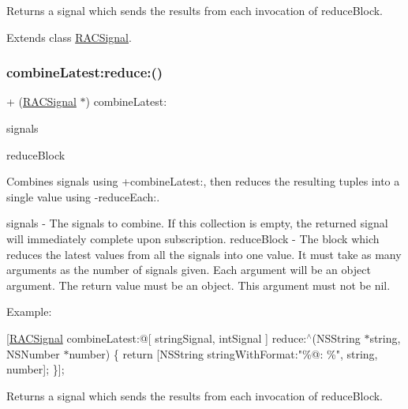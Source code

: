 Returns a signal which sends the results from each invocation of {\ttfamily reduce\+Block}. 

Extends class \mbox{\hyperlink{interface_r_a_c_signal_a5e4d2db914a14c415646d9fdda131221}{R\+A\+C\+Signal}}.

\mbox{\label{category_r_a_c_signal_07_operations_08_a5e4d2db914a14c415646d9fdda131221}} 
\subsubsection{\texorpdfstring{combine\+Latest\+:reduce\+:()}{combineLatest:reduce:()}\hspace{0.1cm}{\footnotesize\ttfamily [3/3]}}
{\footnotesize\ttfamily + (\mbox{\hyperlink{interface_r_a_c_signal}{R\+A\+C\+Signal}} $\ast$) combine\+Latest\+: \begin{DoxyParamCaption}\item[{(id$<$N\+S\+Fast\+Enumeration$>$)}]{signals }\item[{reduce:(id($^\wedge$)())}]{reduce\+Block }\end{DoxyParamCaption}}

Combines signals using +combine\+Latest\+:, then reduces the resulting tuples into a single value using -\/reduce\+Each\+:.

signals -\/ The signals to combine. If this collection is empty, the returned signal will immediately complete upon subscription. reduce\+Block -\/ The block which reduces the latest values from all the signals into one value. It must take as many arguments as the number of signals given. Each argument will be an object argument. The return value must be an object. This argument must not be nil.

Example\+:

\mbox{[}\mbox{\hyperlink{interface_r_a_c_signal}{R\+A\+C\+Signal}} combine\+Latest\+:@\mbox{[} string\+Signal, int\+Signal \mbox{]} reduce\+:$^\wedge$(N\+S\+String $\ast$string, N\+S\+Number $\ast$number) \{ return \mbox{[}N\+S\+String string\+With\+Format\+:"\%@\+: \%", string, number\mbox{]}; \}\mbox{]};

Returns a signal which sends the results from each invocation of {\ttfamily reduce\+Block}. 

